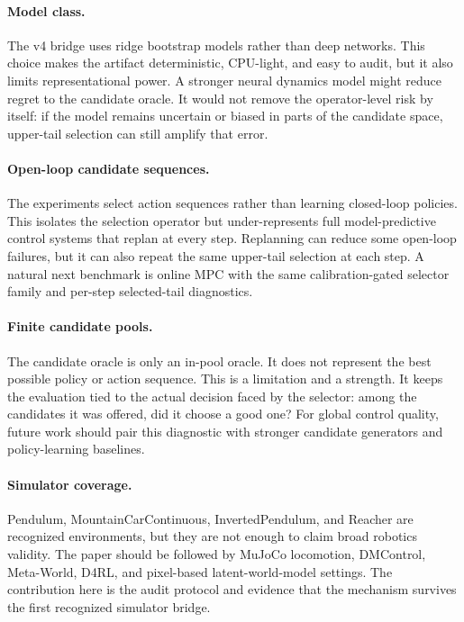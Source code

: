 \documentclass{article}
\begin{document}
\paragraph{Model class.}
The v4 bridge uses ridge bootstrap models rather than deep networks. This
choice makes the artifact deterministic, CPU-light, and easy to audit, but it
also limits representational power. A stronger neural dynamics model might
reduce regret to the candidate oracle. It would not remove the operator-level
risk by itself: if the model remains uncertain or biased in parts of the
candidate space, upper-tail selection can still amplify that error.

\paragraph{Open-loop candidate sequences.}
The experiments select action sequences rather than learning closed-loop
policies. This isolates the selection operator but under-represents full
model-predictive control systems that replan at every step. Replanning can
reduce some open-loop failures, but it can also repeat the same upper-tail
selection at each step. A natural next benchmark is online MPC with the same
calibration-gated selector family and per-step selected-tail diagnostics.

\paragraph{Finite candidate pools.}
The candidate oracle is only an in-pool oracle. It does not represent the best
possible policy or action sequence. This is a limitation and a strength. It
keeps the evaluation tied to the actual decision faced by the selector: among
the candidates it was offered, did it choose a good one? For global control
quality, future work should pair this diagnostic with stronger candidate
generators and policy-learning baselines.

\paragraph{Simulator coverage.}
Pendulum, MountainCarContinuous, InvertedPendulum, and Reacher are recognized
environments, but they are not enough to claim broad robotics validity. The
paper should be followed by MuJoCo locomotion, DMControl, Meta-World, D4RL, and
pixel-based latent-world-model settings. The contribution here is the audit
protocol and evidence that the mechanism survives the first recognized
simulator bridge.
\end{document}
